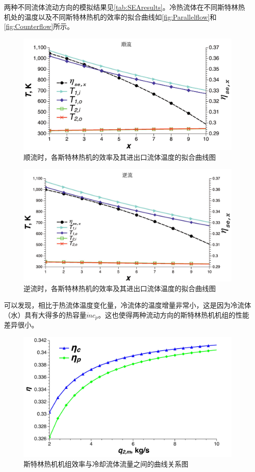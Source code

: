 两种不同流体流动方向的模拟结果见\autoref{tab:SEAresults}。冷热流体在不同斯特林热机处的温度以及不同斯特林热机的效率的拟合曲线如\autoref{fig:Parallelflow}和\autoref{fig:Counterflow}所示。

\begin{figure}[ht!]
\centering
	\includegraphics[width = 0.8\columnwidth]{fig/Parallelflow.pdf}
	\caption{顺流时，各斯特林热机的效率及其进出口流体温度的拟合曲线图}
	\label{fig:Parallelflow}
\end{figure}

\begin{figure}[ht!]
\centering
	\includegraphics[width = 0.8\columnwidth]{fig/Counterflow.pdf}
	\caption{逆流时，各斯特林热机的效率及其进出口流体温度的拟合曲线图}
	\label{fig:Counterflow}
\end{figure}

可以发现，相比于热流体温度变化量，冷流体的温度增量非常小，这是因为冷流体（水）具有大得多的热容量$\dot{m}c_p$。这也使得两种流动方向的斯特林热机机组的性能差异很小。

\begin{figure}[htbp]
\centering
	\includegraphics[width = 0.8\columnwidth, angle = 0]{fig/SEAflowtypes}
	\caption{斯特林热机机组效率与冷却流体流量之间的曲线关系图}
	\label{fig:SEAflowtypes}
\end{figure}

